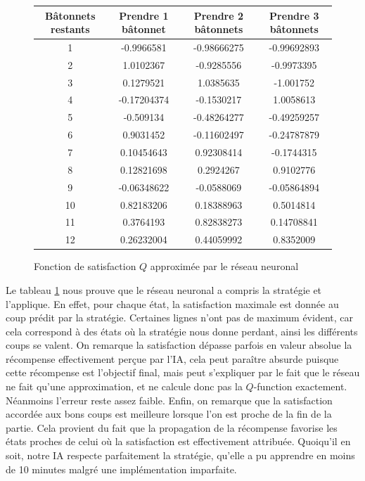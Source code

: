 \begin{figure}[h]
\centering
\begin{tabular}{|c|c|c|c|}
\hline
Bâtonnets restants & Prendre 1 bâtonnet & Prendre 2 bâtonnets & Prendre 3 bâtonnets\\
\hline
1 & -0.9966581 & -0.98666275 & -0.99692893\\
\hline
2 & \cellcolor{green} 1.0102367 & -0.9285556 & -0.9973395\\
\hline
3 & 0.1279521 & \cellcolor{green} 1.0385635 & -1.001752\\
\hline
4 & -0.17204374 & -0.1530217 & \cellcolor{green} 1.0058613\\
\hline
5 & -0.509134 & -0.48264277 & -0.49259257\\
\hline
6 & \cellcolor{green} 0.9031452 & -0.11602497 & -0.24787879\\
\hline
7 & 0.10454643 & \cellcolor{green} 0.92308414 & -0.1744315\\
\hline
8 & 0.12821698 & 0.2924267 & \cellcolor{green} 0.9102776\\
\hline
9 & -0.06348622 & -0.0588069 & -0.05864894\\
\hline
10 & \cellcolor{green} 0.82183206 & 0.18388963 & 0.5014814\\
\hline
11 & 0.3764193 & \cellcolor{green} 0.82838273 & 0.14708841\\
\hline
12 & 0.26232004 & 0.44059992 & \cellcolor{green} 0.8352009\\
\hline
\end{tabular}
\caption{Fonction de satisfaction $Q$ approximée par le réseau neuronal}
\label{tab:Qfunction}
\end{figure}

Le tableau \ref{tab:Qfunction} nous prouve que le réseau neuronal a compris la stratégie et l'applique. En effet, pour chaque état, la satisfaction maximale est donnée
au coup prédit par la stratégie. Certaines lignes n'ont pas de maximum évident, car cela correspond à des états où la stratégie nous donne perdant, ainsi les différents
coups se valent. On remarque la satisfaction dépasse parfois en valeur absolue la récompense effectivement perçue par l'IA, cela peut paraître absurde puisque cette 
récompense est l'objectif final, mais peut s'expliquer par le fait que le réseau ne fait qu'une approximation, et ne calcule donc pas la $Q$-function exactement.
Néanmoins l'erreur reste assez faible. Enfin, on remarque que la satisfaction accordée aux bons coups est meilleure lorsque l'on est proche de la fin de la partie.
Cela provient du fait que la propagation de la récompense favorise les états proches de celui où la satisfaction est effectivement attribuée. Quoiqu'il en soit, notre IA
respecte parfaitement la stratégie, qu'elle a pu apprendre en moins de 10 minutes malgré une implémentation imparfaite.



